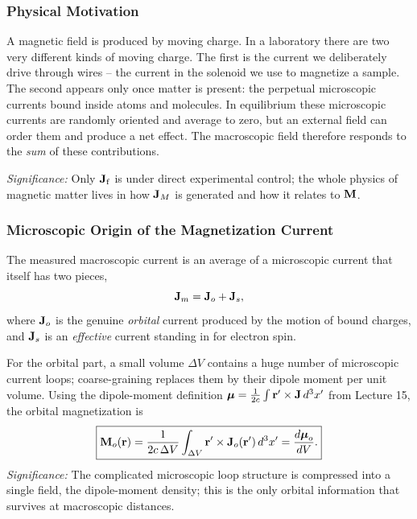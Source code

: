 \subsubsection*{Physical Motivation}
A magnetic field is produced by moving charge.  In a laboratory there are two very
different kinds of moving charge.  The first is the current we deliberately drive
through wires -- the current in the solenoid we use to magnetize a sample.  The second
appears only once matter is present: the perpetual microscopic currents bound inside
atoms and molecules.  In equilibrium these microscopic currents are randomly oriented
and average to zero, but an external field can order them and produce a net effect.
The macroscopic field therefore responds to the \emph{sum} of these contributions.

\textit{Significance:} Only $\mathbf{J}_{\rm f}$ is under direct experimental control; the
whole physics of magnetic matter lives in how $\mathbf{J}_M$ is generated and how it relates
to $\mathbf{M}$.

\subsubsection*{Microscopic Origin of the Magnetization Current}
The measured macroscopic current is an average of a microscopic current that itself has
two pieces,
\begin{equation}\label{eq:lec17-Jm-split}
  \mathbf{J}_m=\mathbf{J}_o+\mathbf{J}_s,
\end{equation}
where $\mathbf{J}_o$ is the genuine \emph{orbital} current produced by the motion of bound
charges, and $\mathbf{J}_s$ is an \emph{effective} current standing in for electron spin.

For the orbital part, a small volume $\Delta V$ contains a huge number of microscopic
current loops; coarse-graining replaces them by their dipole moment per unit volume.
Using the dipole-moment definition $\boldsymbol{\mu}=\tfrac{1}{2c}\int \mathbf{r}'\times\mathbf{J}\,d^3x'$ from
Lecture 15, the orbital magnetization is
\begin{equation}\label{eq:lec17-Mo-def}
  \boxed{\mathbf{M}_o(\mathbf{r})=\frac{1}{2c\,\Delta V}\int_{\Delta V}\mathbf{r}'\times\mathbf{J}_o(\mathbf{r}')\,d^3x'
  =\frac{d\boldsymbol{\mu}_o}{dV}.}
\end{equation}
\textit{Significance:} The complicated microscopic loop structure is compressed into a
single field, the dipole-moment density; this is the only orbital information that
survives at macroscopic distances.

